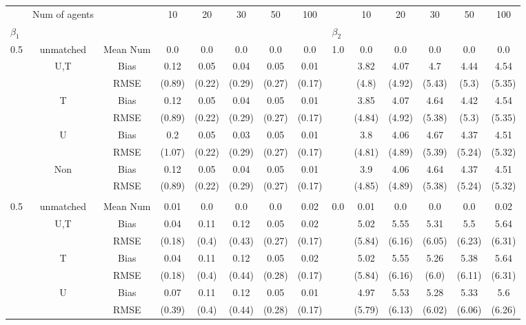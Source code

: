 \begin{tabular}{@{\extracolsep{5pt}}lc|cccccc|lccccc}
\toprule 
 & Num of agents &  & 10 & 20 & 30 & 50 & 100 &  & 10 & 20 & 30 & 50 & 100 \\
$\beta_1$ &  &  &  &  &  &  &  & $\beta_2$ &  &  &  &  &  \\
\midrule 
0.5 & unmatched & Mean Num & 0.0 & 0.0 & 0.0 & 0.0 & 0.0 & 1.0 & 0.0 & 0.0 & 0.0 & 0.0 & 0.0 \\
 & U,T & Bias & 0.12 & 0.05 & 0.04 & 0.05 & 0.01 &  & 3.82 & 4.07 & 4.7 & 4.44 & 4.54 \\
 &  & RMSE & (0.89) & (0.22) & (0.29) & (0.27) & (0.17) &  & (4.8) & (4.92) & (5.43) & (5.3) & (5.35) \\
 & T & Bias & 0.12 & 0.05 & 0.04 & 0.05 & 0.01 &  & 3.85 & 4.07 & 4.64 & 4.42 & 4.54 \\
 &  & RMSE & (0.89) & (0.22) & (0.29) & (0.27) & (0.17) &  & (4.84) & (4.92) & (5.38) & (5.3) & (5.35) \\
 & U & Bias & 0.2 & 0.05 & 0.03 & 0.05 & 0.01 &  & 3.8 & 4.06 & 4.67 & 4.37 & 4.51 \\
 &  & RMSE & (1.07) & (0.22) & (0.29) & (0.27) & (0.17) &  & (4.81) & (4.89) & (5.39) & (5.24) & (5.32) \\
 & Non & Bias & 0.12 & 0.05 & 0.04 & 0.05 & 0.01 &  & 3.9 & 4.06 & 4.64 & 4.37 & 4.51 \\
 &  & RMSE & (0.89) & (0.22) & (0.29) & (0.27) & (0.17) &  & (4.85) & (4.89) & (5.38) & (5.24) & (5.32) \\
 &  &  &  &  &  &  &  &  &  &  &  &  &  \\
0.5 & unmatched & Mean Num & 0.01 & 0.0 & 0.0 & 0.0 & 0.02 & 0.0 & 0.01 & 0.0 & 0.0 & 0.0 & 0.02 \\
 & U,T & Bias & 0.04 & 0.11 & 0.12 & 0.05 & 0.02 &  & 5.02 & 5.55 & 5.31 & 5.5 & 5.64 \\
 &  & RMSE & (0.18) & (0.4) & (0.43) & (0.27) & (0.17) &  & (5.84) & (6.16) & (6.05) & (6.23) & (6.31) \\
 & T & Bias & 0.04 & 0.11 & 0.12 & 0.05 & 0.02 &  & 5.02 & 5.55 & 5.26 & 5.38 & 5.64 \\
 &  & RMSE & (0.18) & (0.4) & (0.44) & (0.28) & (0.17) &  & (5.84) & (6.16) & (6.0) & (6.11) & (6.31) \\
 & U & Bias & 0.07 & 0.11 & 0.12 & 0.05 & 0.01 &  & 4.97 & 5.53 & 5.28 & 5.33 & 5.6 \\
 &  & RMSE & (0.39) & (0.4) & (0.44) & (0.28) & (0.17) &  & (5.79) & (6.13) & (6.02) & (6.06) & (6.26) \\

\end{tabular}
